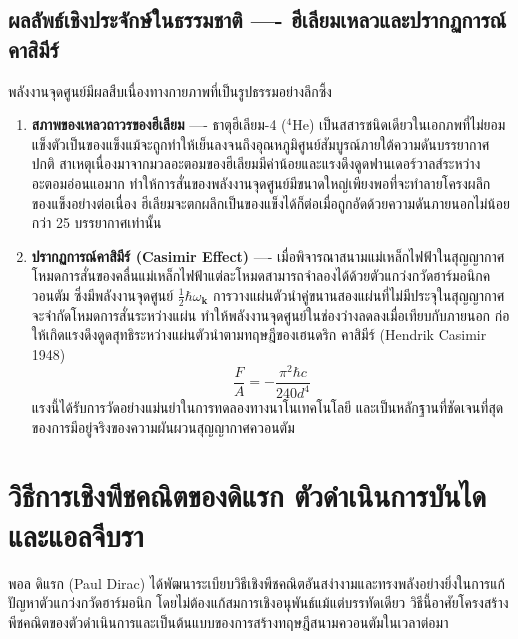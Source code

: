 \subsection{ผลลัพธ์เชิงประจักษ์ในธรรมชาติ ---- ฮีเลียมเหลวและปรากฏการณ์คาสิมีร์}
พลังงานจุดศูนย์มีผลสืบเนื่องทางกายภาพที่เป็นรูปธรรมอย่างลึกซึ้ง
\begin{enumerate}
    \item \textbf{สภาพของเหลวถาวรของฮีเลียม} ---- ธาตุฮีเลียม-4 ($^4\text{He}$) เป็นสสารชนิดเดียวในเอกภพที่ไม่ยอมแข็งตัวเป็นของแข็งแม้จะถูกทำให้เย็นลงจนถึงอุณหภูมิศูนย์สัมบูรณ์ภายใต้ความดันบรรยากาศปกติ สาเหตุเนื่องมาจากมวลอะตอมของฮีเลียมมีค่าน้อยและแรงดึงดูดฟานเดอร์วาลส์ระหว่างอะตอมอ่อนแอมาก ทำให้การสั่นของพลังงานจุดศูนย์มีขนาดใหญ่เพียงพอที่จะทำลายโครงผลึกของแข็งอย่างต่อเนื่อง ฮีเลียมจะตกผลึกเป็นของแข็งได้ก็ต่อเมื่อถูกอัดด้วยความดันภายนอกไม่น้อยกว่า 25 บรรยากาศเท่านั้น
    \item \textbf{ปรากฏการณ์คาสิมีร์ (Casimir Effect)} ---- เมื่อพิจารณาสนามแม่เหล็กไฟฟ้าในสุญญากาศ โหมดการสั่นของคลื่นแม่เหล็กไฟฟ้าแต่ละโหมดสามารถจำลองได้ด้วยตัวแกว่งกวัดฮาร์มอนิกควอนตัม ซึ่งมีพลังงานจุดศูนย์ $\frac{1}{2}\hbar\omega_\mathbf{k}$ การวางแผ่นตัวนำคู่ขนานสองแผ่นที่ไม่มีประจุในสุญญากาศจะจำกัดโหมดการสั่นระหว่างแผ่น ทำให้พลังงานจุดศูนย์ในช่องว่างลดลงเมื่อเทียบกับภายนอก ก่อให้เกิดแรงดึงดูดสุทธิระหว่างแผ่นตัวนำตามทฤษฎีของเฮนดริก คาสิมีร์ (Hendrik Casimir 1948)
    \begin{equation}
    \frac{F}{A} = -\frac{\pi^2 \hbar c}{240 d^4}
    \end{equation}
    แรงนี้ได้รับการวัดอย่างแม่นยำในการทดลองทางนาโนเทคโนโลยี และเป็นหลักฐานที่ชัดเจนที่สุดของการมีอยู่จริงของความผันผวนสุญญากาศควอนตัม
\end{enumerate}

\section{วิธีการเชิงพีชคณิตของดิแรก ตัวดำเนินการบันไดและแอลจีบรา}
\label{sec_dirac_ladder_algebra}

พอล ดิแรก (Paul Dirac) ได้พัฒนาระเบียบวิธีเชิงพีชคณิตอันสง่างามและทรงพลังอย่างยิ่งในการแก้ปัญหาตัวแกว่งกวัดฮาร์มอนิก โดยไม่ต้องแก้สมการเชิงอนุพันธ์แม้แต่บรรทัดเดียว วิธีนี้อาศัยโครงสร้างพีชคณิตของตัวดำเนินการและเป็นต้นแบบของการสร้างทฤษฎีสนามควอนตัมในเวลาต่อมา

